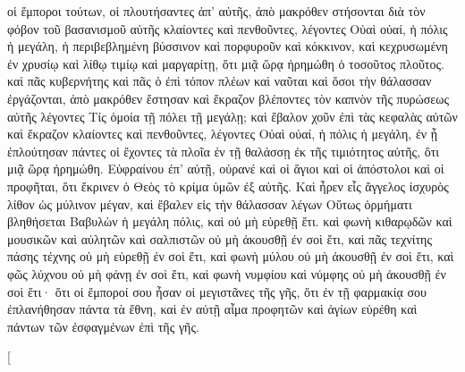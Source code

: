 \begin{pages}
\begin{Rightside}
		\pend
		\pstart
		οἱ ἔμποροι τούτων, οἱ πλουτήσαντες ἀπ’ αὐτῆς, ἀπὸ μακρόθεν στήσονται διὰ τὸν φόβον τοῦ βασανισμοῦ αὐτῆς κλαίοντες καὶ πενθοῦντες, λέγοντες Οὐαὶ οὐαί, ἡ πόλις ἡ μεγάλη, ἡ περιβεβλημένη βύσσινον καὶ πορφυροῦν καὶ κόκκινον, καὶ κεχρυσωμένη ἐν χρυσίῳ καὶ λίθῳ τιμίῳ καὶ μαργαρίτῃ, ὅτι μιᾷ ὥρᾳ ἠρημώθη ὁ τοσοῦτος πλοῦτος. 
		\pend
		\pstart
		καὶ πᾶς κυβερνήτης καὶ πᾶς ὁ ἐπὶ τόπον πλέων καὶ ναῦται καὶ ὅσοι τὴν θάλασσαν ἐργάζονται, ἀπὸ μακρόθεν ἔστησαν καὶ ἔκραζον βλέποντες τὸν καπνὸν τῆς πυρώσεως αὐτῆς λέγοντες Τίς ὁμοία τῇ πόλει τῇ μεγάλῃ; καὶ ἔβαλον χοῦν ἐπὶ τὰς κεφαλὰς αὐτῶν καὶ ἔκραζον κλαίοντες καὶ πενθοῦντες, λέγοντες Οὐαὶ οὐαί, ἡ πόλις ἡ μεγάλη, ἐν ᾗ ἐπλούτησαν πάντες οἱ ἔχοντες τὰ πλοῖα ἐν τῇ θαλάσσῃ ἐκ τῆς τιμιότητος αὐτῆς, ὅτι μιᾷ ὥρᾳ ἠρημώθη. Εὐφραίνου ἐπ’ αὐτῇ, οὐρανέ καὶ οἱ ἅγιοι καὶ οἱ ἀπόστολοι καὶ οἱ προφῆται, ὅτι ἔκρινεν ὁ Θεὸς τὸ κρίμα ὑμῶν ἐξ αὐτῆς. 
		\pend
		\pstart
		Καὶ ἦρεν εἷς ἄγγελος ἰσχυρὸς λίθον ὡς μύλινον μέγαν, καὶ ἔβαλεν εἰς τὴν θάλασσαν λέγων Οὕτως ὁρμήματι βληθήσεται Βαβυλὼν ἡ μεγάλη πόλις, καὶ οὐ μὴ εὑρεθῇ ἔτι. καὶ φωνὴ κιθαρῳδῶν καὶ μουσικῶν καὶ αὐλητῶν καὶ σαλπιστῶν οὐ μὴ ἀκουσθῇ ἐν σοὶ ἔτι, καὶ πᾶς τεχνίτης πάσης τέχνης οὐ μὴ εὑρεθῇ ἐν σοὶ ἔτι, καὶ φωνὴ μύλου οὐ μὴ ἀκουσθῇ ἐν σοὶ ἔτι, καὶ φῶς λύχνου οὐ μὴ φάνῃ ἐν σοὶ ἔτι, καὶ φωνὴ νυμφίου καὶ νύμφης οὐ μὴ ἀκουσθῇ ἐν σοὶ ἔτι· ὅτι οἱ ἔμποροί σου ἦσαν οἱ μεγιστᾶνες τῆς γῆς, ὅτι ἐν τῇ φαρμακίᾳ σου ἐπλανήθησαν πάντα τὰ ἔθνη, καὶ ἐν αὐτῇ αἷμα προφητῶν καὶ ἁγίων εὑρέθη καὶ πάντων τῶν ἐσφαγμένων ἐπὶ τῆς γῆς.				
		\pend
        \endnumbering
    \end{Rightside}
    \begin{Leftside}
        \beginnumbering
        \pstart[

\end{Leftside}
\end{pages}
